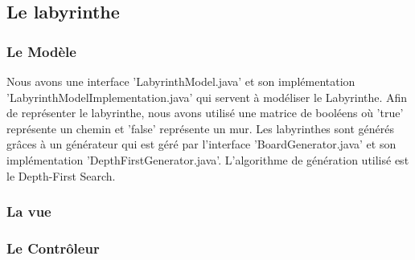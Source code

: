 \subsection{Le labyrinthe}
\label{subsec:labyrinthe}


\subsubsection{Le Modèle}


Nous avons une interface 'LabyrinthModel.java' et son implémentation 'LabyrinthModelImplementation.java' qui servent à modéliser le Labyrinthe. Afin de représenter le labyrinthe, nous avons utilisé une matrice de booléens où 'true' représente un chemin et 'false' représente un mur. Les labyrinthes sont générés grâces à un générateur qui est géré par l'interface 'BoardGenerator.java' et son implémentation 'DepthFirstGenerator.java'. L'algorithme de génération utilisé est le Depth-First Search.

\subsubsection{La vue}

\subsubsection{Le Contrôleur}







